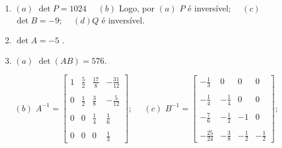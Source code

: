 \documentclass{report}
\begin{document}
\begin{enumerate}





\item $(a)$ $\det P = 1024$ \ \ $(b)$ Logo, por $(a)$ $P$ é
inversível;  \ \ $(c)$ $\det B = -9$; \ \ $(d)$$Q$ é inversível.



\item $\det A =-5$ .


\item $(a)$ $\det(AB)=576$.

$(b)$ $A^{-1}= \left[
\begin{array}{rrrr}
1 & \frac{5}{2} & \frac{17}{8} & -\frac{31}{12} \\
& & & \\
0 & \frac{1}{2} & \frac{3}{8} & -\frac{5}{12} \\
& & & \\
0 & 0 & \frac{1}{4} & \frac{1}{6} \\
& & & \\
0 & 0 & 0 & \frac{1}{3}
\end{array}
\right];$ \ \ $(c)$ $B^{-1}= \left[
\begin{array}{rrrr}
-\frac{1}{3} & 0 & 0 & 0 \\
& & & \\
-\frac{1}{4} & -\frac{1}{4} & 0 & 0 \\
& & & \\
-\frac{7}{6} & -\frac{1}{2} & -1 & 0 \\
& & & \\
-\frac{25}{24} & -\frac{3}{8} & -\frac{1}{2} & -\frac{1}{2}
\end{array}
\right];$


\end{enumerate}
\end{document}
